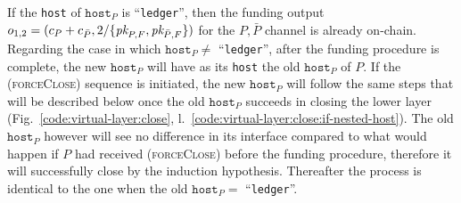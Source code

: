   If the \texttt{host} of $\texttt{host}_P$ is ``\texttt{ledger}'', then the funding output
  $o_{1, 2} = (c_P + c_{\bar{P}}, 2/\{\textit{pk}_{P, F}, \textit{pk}_{\bar{P}, F}\})$ for the
  $P, \bar{P}$ channel is already on-chain. Regarding the case in which
  $\texttt{host}_P \neq$ ``\texttt{ledger}'', after the funding procedure is complete, the
  new $\texttt{host}_P$ will have as its \texttt{host} the old $\texttt{host}_P$
  of $P$. If the (\textsc{forceClose}) sequence is initiated, the new
  $\texttt{host}_P$ will follow the same steps that will be described below once
  the old $\texttt{host}_P$ succeeds in closing the lower layer
  (Fig.~\ref{code:virtual-layer:close},
  l.~\ref{code:virtual-layer:close:if-nested-host}). The old $\texttt{host}_P$
  however will see no difference in its interface compared to what would happen
  if $P$ had received (\textsc{forceClose}) before the funding procedure, therefore
  it will successfully close by the induction hypothesis. Thereafter the process
  is identical to the one when the old $\texttt{host}_P =$ ``\texttt{ledger}''.

